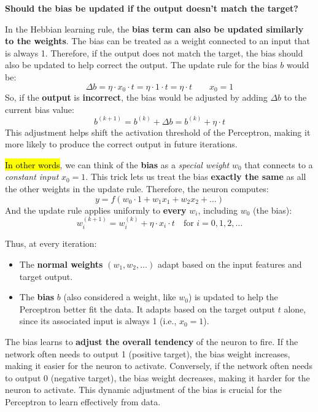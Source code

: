 \newpage

\begin{flushleft}
    \textcolor{Green3}{ \textbf{Should the bias be updated if the output doesn't match the target?}}
\end{flushleft}
In the Hebbian learning rule, the \textbf{bias term can also be updated similarly to the weights}. The bias can be treated as a weight connected to an input that is always 1. Therefore, if the output does not match the target, the bias should also be updated to help correct the output. The update rule for the bias $b$ would be:
\begin{equation}
    \Delta b = \eta \cdot x_{0} \cdot t = \eta \cdot 1 \cdot t = \eta \cdot t \qquad x_{0} = 1
\end{equation}
So, if the \textbf{output} is \textbf{incorrect}, the bias would be adjusted by adding $\Delta b$ to the current bias value:
\begin{equation}
    b^{(k+1)} = b^{(k)} + \Delta b = b^{(k)} + \eta \cdot t
\end{equation}
This adjustment helps shift the activation threshold of the Perceptron, making it more likely to produce the correct output in future iterations.

\highspace
\hl{In other words}, we can think of the \textbf{bias} as a \emph{special weight} $w_{0}$ that connects to a \emph{constant input} $x_{0} = 1$. This trick lets us treat the bias \textbf{exactly the same} as all the other weights in the update rule. Therefore, the neuron computes:
\begin{equation*}
    y = f\left(w_0 \cdot 1 + w_1 x_1 + w_2 x_2 + \dots\right)
\end{equation*}
And the update rule applies uniformly to \textbf{every} $w_i$, including $w_0$ (the bias):
\begin{equation*}
    w_{i}^{(k+1)} = w_{i}^{(k)} + \eta \cdot x_{i} \cdot t \quad \text{for }i = 0, 1, 2, \ldots
\end{equation*}

\highspace
Thus, at every iteration:
\begin{itemize}
    \item The \textbf{normal weights} $\left(w_{1}, w_{2}, \ldots\right)$ adapt based on the input features and target output.
    \item The \textbf{bias} $b$ (also considered a weight, like $w_{0}$) is updated to help the Perceptron better fit the data. It adapts based on the target output $t$ alone, since its associated input is always 1 (i.e., $x_{0} = 1$).
\end{itemize}
The bias learns to \textbf{adjust the overall tendency} of the neuron to fire. If the network often needs to output 1 (positive target), the bias weight increases, making it easier for the neuron to activate. Conversely, if the network often needs to output 0 (negative target), the bias weight decreases, making it harder for the neuron to activate. This dynamic adjustment of the bias is crucial for the Perceptron to learn effectively from data.